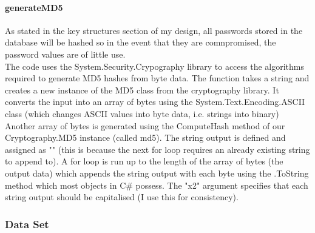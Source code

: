 ﻿\documentclass{article}
\begin{document}
    \paragraph{generateMD5}
    As stated in the key structures section of my design, all passwords stored in the database will be hashed so in the event that they are comnpromised, the password values are of little use.
    \\
    The code uses the System.Security.Crypography library to access the algorithms required to generate MD5 hashes from byte data.
    The function takes a string and creates a new instance of the MD5 class from the cryptography library.
    It converts the input into an array of bytes using the System.Text.Encoding.ASCII class (which changes ASCII values into byte data, i.e. strings into binary)
    Another array of bytes is generated using the ComputeHash method of our Cryptography.MD5 instance (called md5).
    The string output is defined and assigned as "" (this is because the next for loop requires an already existing string to append to).
    A for loop is run up to the length of the array of bytes (the output data) which appends the string output with each byte using the .ToString method which most objects in C\# possess.
    The "x2" argument specifies that each string output should be capitalised (I use this for consistency).
    \newpage
    \subsubsection{Data Set}
\end{document}

